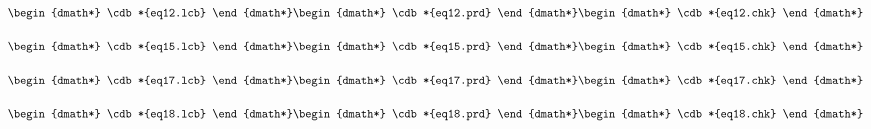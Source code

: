 \documentclass[12pt]{cdblatex}
\begin{document}

   \begin{dgroup*}
      \begin{dmath*} \cdb*{eq12.lcb} \end{dmath*}
      \begin{dmath*} \cdb*{eq12.prd} \end{dmath*}
      \begin{dmath*} \cdb*{eq12.chk} \end{dmath*}
   \end{dgroup*}


   \begin{dgroup*}
      \begin{dmath*} \cdb*{eq15.lcb} \end{dmath*}
      \begin{dmath*} \cdb*{eq15.prd} \end{dmath*}
      \begin{dmath*} \cdb*{eq15.chk} \end{dmath*}
   \end{dgroup*}


   \begin{dgroup*}
      \begin{dmath*} \cdb*{eq17.lcb} \end{dmath*}
      \begin{dmath*} \cdb*{eq17.prd} \end{dmath*}
      \begin{dmath*} \cdb*{eq17.chk} \end{dmath*}
   \end{dgroup*}


   \begin{dgroup*}
      \begin{dmath*} \cdb*{eq18.lcb} \end{dmath*}
      \begin{dmath*} \cdb*{eq18.prd} \end{dmath*}
      \begin{dmath*} \cdb*{eq18.chk} \end{dmath*}
   \end{dgroup*}
\end{document}
